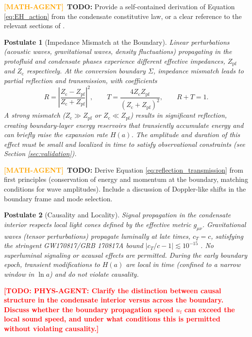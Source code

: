\documentclass[11pt,a4paper]{article}
\newcommand{\Zpf}{Z_{\mathrm{pf}}}
\newcommand{\Zcond}{Z_{\mathrm{c}}}
\newcommand{\uf}{u_{\mathrm{f}}}
\newtheorem{postulate}{Postulate}
\theoremstyle{definition}
\newcommand{\TODO}[1]{\textcolor{red}{\textbf{[TODO: #1]}}}
\newcommand{\MATHAGENT}{\textcolor{orange}{\textbf{[MATH-AGENT]}}}
\begin{document}
\MATHAGENT~\textbf{TODO:} Provide a self-contained derivation of Equation \eqref{eq:EH_action} from the condensate constitutive law, or a clear reference to the relevant sections of \cite{SkavbergMechG2025,SkavbergMechGR2025}.

\begin{postulate}[Impedance Mismatch at the Boundary]
\label{post:impedance}
Linear perturbations (acoustic waves, gravitational waves, density fluctuations) propagating in the protofluid and condensate phases experience different effective impedances, $\Zpf$ and $\Zcond$ respectively. At the conversion boundary $\Sigma$, impedance mismatch leads to partial reflection and transmission, with coefficients
\begin{equation}
\label{eq:reflection_transmission}
R = \left| \frac{\Zcond - \Zpf}{\Zcond + \Zpf} \right|^2, \qquad T = \frac{4 \Zcond \Zpf}{(\Zcond + \Zpf)^2}, \qquad R + T = 1.
\end{equation}
A strong mismatch ($\Zcond \gg \Zpf$ or $\Zcond \ll \Zpf$) results in significant reflection, creating \emph{boundary-layer energy reservoirs} that transiently accumulate energy and can briefly raise the expansion rate $H(a)$. The amplitude and duration of this effect must be small and localized in time to satisfy observational constraints (see Section \ref{sec:validation}).
\end{postulate}

\MATHAGENT~\textbf{TODO:} Derive Equation \eqref{eq:reflection_transmission} from first principles (conservation of energy and momentum at the boundary, matching conditions for wave amplitudes). Include a discussion of Doppler-like shifts in the boundary frame and mode selection.

\begin{postulate}[Causality and Locality]
\label{post:causality}
Signal propagation in the condensate interior respects local light cones defined by the effective metric $g_{\mu\nu}$. Gravitational waves (tensor perturbations) propagate luminally at late times, $c_T = c$, satisfying the stringent GW170817/GRB 170817A bound $|c_T/c - 1| \lesssim 10^{-15}$ \cite{GW170817}. No superluminal signaling or acausal effects are permitted. During the early boundary epoch, transient modifications to $H(a)$ are local in time (confined to a narrow window in $\ln a$) and do not violate causality.
\end{postulate}

\TODO{PHYS-AGENT: Clarify the distinction between causal structure in the condensate interior versus across the boundary. Discuss whether the boundary propagation speed $\uf$ can exceed the local sound speed, and under what conditions this is permitted without violating causality.}
\end{document}
